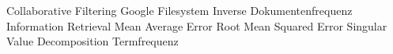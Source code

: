 \begin{acronym}[XXXXXXX]
	\setlength{\itemsep --- }{-\parsep}
  \setlength{\itemsep}{1pt}
  \setlength{\parskip}{0pt}
  \setlength{\parsep}{0pt}
         {Collaborative Filtering}
         {Google Filesystem}
         {Inverse Dokumentenfrequenz}
         {Information Retrieval}
         {Mean Average Error}
         {Root Mean Squared Error}
         {Singular Value Decomposition}
         {Termfrequenz}
\end{acronym}
